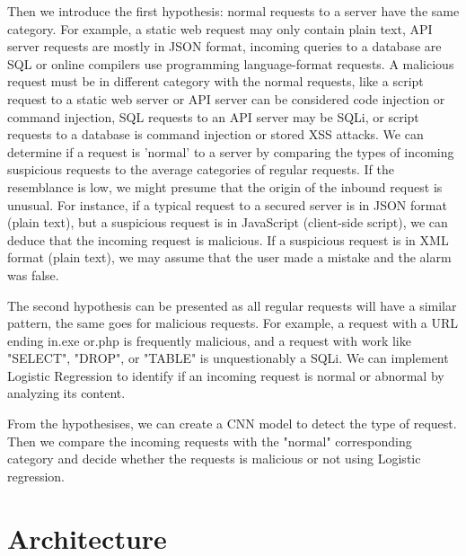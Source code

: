 Then we introduce the first hypothesis: normal requests to a server have the same category. For example, a static web request may only contain plain text, API server requests are mostly in JSON format, incoming queries to a database are SQL or online compilers use programming language-format requests. A malicious request must be in different category with the normal requests, like a script request to a static web server or API server can be considered code injection or command injection, SQL requests to an API server may be SQLi, or script requests to a database is command injection or stored XSS attacks. We can determine if a request is 'normal' to a server by comparing the types of incoming suspicious requests to the average categories of regular requests. If the resemblance is low, we might presume that the origin of the inbound request is unusual. For instance, if a typical request to a secured server is in JSON format (plain text), but a suspicious request is in JavaScript (client-side script), we can deduce that the incoming request is malicious. If a suspicious request is in XML format (plain text), we may assume that the user made a mistake and the alarm was false.



The second hypothesis can be presented as all regular requests will have a similar pattern, the same goes for malicious requests. For example, a request with a URL ending in.exe or.php is frequently malicious, and a request with work like "SELECT", "DROP", or "TABLE" is unquestionably a SQLi. We can implement Logistic Regression to identify if an incoming request is normal or abnormal by analyzing its content.

From the hypothesises, we can create a CNN model to detect the type of request. Then we compare the incoming requests with the "normal" corresponding category and decide whether the requests is malicious or not using Logistic regression.


\section{Architecture}
\label{architecture design}


